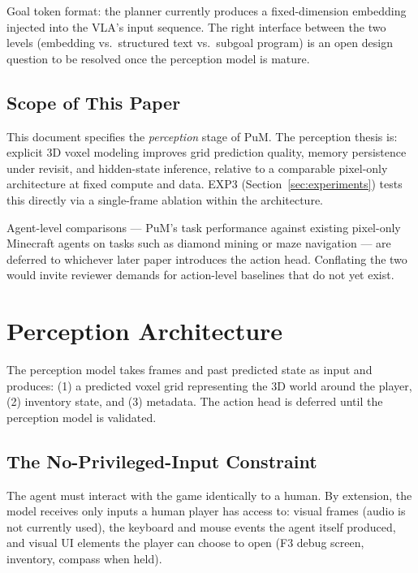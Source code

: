 \documentclass[11pt,a4paper]{article}
\begin{document}
\begin{openquestion}
Goal token format: the planner currently produces a fixed-dimension embedding injected into the VLA's input sequence. The right interface between the two levels (embedding vs.\ structured text vs.\ subgoal program) is an open design question to be resolved once the perception model is mature.
\end{openquestion}

\subsection{Scope of This Paper}

This document specifies the \textit{perception} stage of PuM. The perception thesis is: explicit 3D voxel modeling improves grid prediction quality, memory persistence under revisit, and hidden-state inference, relative to a comparable pixel-only architecture at fixed compute and data. EXP3 (Section~\ref{sec:experiments}) tests this directly via a single-frame ablation within the architecture.

Agent-level comparisons --- PuM's task performance against existing pixel-only Minecraft agents on tasks such as diamond mining or maze navigation --- are deferred to whichever later paper introduces the action head. Conflating the two would invite reviewer demands for action-level baselines that do not yet exist.

\section{Perception Architecture}
\label{sec:arch}

The perception model takes frames and past predicted state as input and produces: (1) a predicted voxel grid representing the 3D world around the player, (2) inventory state, and (3) metadata. The action head is deferred until the perception model is validated.

\subsection{The No-Privileged-Input Constraint}
\label{sec:nopriv}

The agent must interact with the game identically to a human. By extension, the model receives only inputs a human player has access to: visual frames (audio is not currently used), the keyboard and mouse events the agent itself produced, and visual UI elements the player can choose to open (F3 debug screen, inventory, compass when held).
\end{document}

